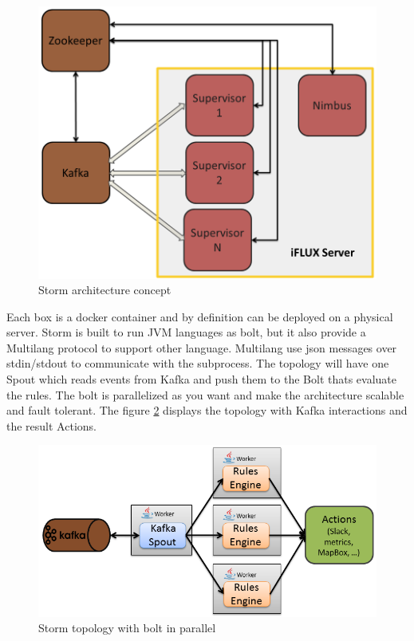 \begin{figure}
\centering
\includegraphics[width=1\columnwidth]{figures/storm-architecture.png}
\caption{Storm architecture concept}
\label{fig:iflux-storm-architecture}
\end{figure}

Each box is a docker container and by definition can be deployed on a physical server. Storm is built to run JVM languages as bolt, but it also provide a Multilang protocol to support other language. Multilang use json messages over stdin/stdout to communicate with the subprocess. The topology will have one Spout which reads events from Kafka and push them to the Bolt thats evaluate the rules. The bolt is parallelized as you want and make the architecture scalable and fault tolerant. The figure \ref{fig:iflux-topology} 
displays the topology with Kafka interactions and the result Actions. 

 \begin{figure}
\centering
\includegraphics[width=1\columnwidth]{figures/storm-topology.png}
\caption{Storm topology with bolt in parallel}
\label{fig:iflux-topology}
\end{figure}

